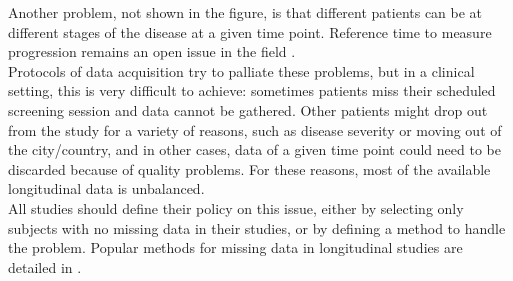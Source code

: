 Another problem, not shown in the figure, is that different patients can be at different stages of the disease at a given time point. Reference time to measure progression remains an open issue in the field \cite{Ashford2001}.  \\

Protocols of data acquisition try to palliate these problems, but in a clinical setting, this is very difficult to achieve: sometimes patients miss their scheduled screening session and data cannot be gathered. Other patients might drop out from the study for a variety of reasons, such as disease severity or moving out of the city/country, and in other cases, data of a given time point could need to be discarded because of quality problems. For these reasons, most of the available longitudinal data is unbalanced. \\

All studies should define their policy on this issue, either by selecting only subjects with no missing data in their studies, or by defining a method to handle the problem. Popular methods for missing data in longitudinal studies are detailed in \cite{Ibrahim}. \\
